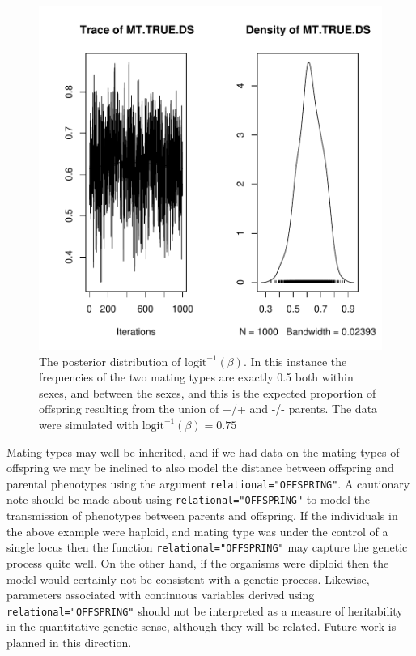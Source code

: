 \documentclass{article}
\begin{document}
\begin{figure}[!h]
\begin{center}
\includegraphics{Tutorial-089}
\end{center}
\caption{The posterior distribution of $\textrm{logit}^{-1}(\beta)$.  In this instance the frequencies of the two mating types are exactly 0.5 both within sexes, and between the sexes, and this is the expected proportion of offspring resulting from the union of +/+ and -/- parents. The data were simulated with $\textrm{logit}^{-1}(\beta)=0.75$}
\label{model.ass.mat}
\end{figure}

Mating types may well be inherited, and if we had data on the mating types of offspring we may be inclined to also model the distance between offspring and parental phenotypes using the argument \texttt{relational="OFFSPRING"}.  A cautionary note should be made about using \texttt{relational="OFFSPRING"} to model the transmission of phenotypes between parents and offspring.  If the individuals in the above example were haploid, and mating type was under the control of a single locus then the function \texttt{relational="OFFSPRING"} may capture the genetic process quite well.  On the other hand, if the organisms were diploid then the model would certainly not be consistent with a genetic process.  Likewise, parameters associated with continuous variables derived using \texttt{relational="OFFSPRING"} should not be interpreted as a measure of heritability in the quantitative genetic sense, although they will be related.  Future work is planned in this direction.\\
\end{document}
